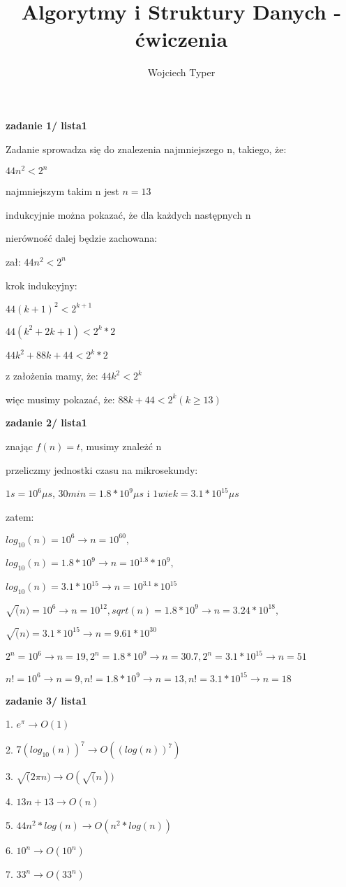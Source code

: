\documentclass{article}
\title{Algorytmy i Struktury Danych - ćwiczenia}
\author{Wojciech Typer}
\date{}
\begin{document}
\maketitle
\textbf{zadanie 1/ lista1} \par
Zadanie sprowadza się do znalezenia najmniejszego n, 
takiego, że: \par
$44n^2 < 2^n$ \par
najmniejszym takim n jest $n = 13$ \par
indukcyjnie można pokazać, że dla każdych następnych n \par
nierówność dalej będzie zachowana: \par
zał: $44n^2 < 2^n$ \par
krok indukcyjny: \par
$44(k + 1)^2 < 2^{k + 1}$ \par
$44(k^2 + 2k + 1) < 2^k * 2$ \par
$44k^2 + 88k + 44 < 2^k * 2$ \par
z założenia mamy, że: $44k^2 < 2^k$ \par
więc musimy pokazać, że: $88k + 44 < 2^k (k \geq 13)$ \par

\vspace{1\baselineskip}
\textbf{zadanie 2/ lista1} \par
znając $f(n) = t$, musimy znależć n \par
przeliczmy jednostki czasu na mikrosekundy: \par
$1s = 10^6 \mu s$, $30min = 1.8 * 10^9 \mu s$ i $1 wiek = 3.1 * 10^15 \mu s$\par
zatem: \par
$log_{10}(n) = 10^6  \rightarrow n = 10^{60},$ \par $ log_{10}(n) = 1.8 * 10^9  \rightarrow n = 10^1.8 * 10^9,$ \par $ log_{10}(n) = 3.1 * 10^{15}  \rightarrow n = 10^3.1 * 10^{15}$ \par
$\sqrt(n) = 10^6  \rightarrow n = 10^{12}, sqrt(n) = 1.8 * 10^9  \rightarrow n = 3.24 * 10^{18},$ \par $ \sqrt(n) = 3.1 * 10^{15}  \rightarrow n = 9.61 * 10^{30}$ \par
$2^n = 10^6  \rightarrow n = 19, 2^n = 1.8 * 10^9  \rightarrow n = 30.7, 2^n = 3.1 * 10^{15}  \rightarrow n = 51$ \par
$n! = 10^6  \rightarrow n = 9, n! = 1.8 * 10^9  \rightarrow n = 13, n! = 3.1 * 10^{15}  \rightarrow n = 18$ \par

\vspace{1\baselineskip}
\textbf{zadanie 3/ lista1} \par
1. $e^{\pi}   \rightarrow O(1)$ \par
2. $7(log_{10}(n))^7  \rightarrow O((log(n))^7)$ \par
3. $\sqrt(2\pi n)  \rightarrow O(\sqrt(n))$ \par
4. $13n + 13  \rightarrow O(n)$ \par
5. $44n^2 * log(n)  \rightarrow O(n^2 * log(n))$ \par
6. $10^n  \rightarrow O(10^n)$ \par
7. $33^n  \rightarrow O(33^n)$ \par 
\end{document}
